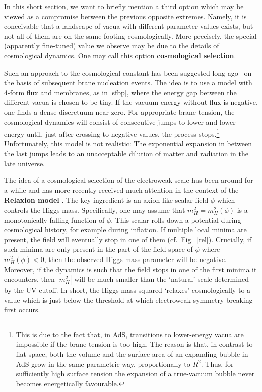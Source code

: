 \documentclass[12pt]{article}
\numberwithin{equation}{section}
\begin{document}
In this short section, we want to briefly mention a third option which may be viewed as a compromise between the previous opposite extremes. Namely, it is conceivable that a landscape of vacua with different parameter values exists, but not all of them are on the same footing cosmologically. More precisely, the special (apparently fine-tuned) value we observe may be due to the details of cosmological dynamics. One may call this option {\bf cosmological selection}.

Such an approach to the cosmological constant has been suggested long ago~\cite{Abbott:1984qf, Brown:1987dd, Feng:2000if} on the basis of subsequent brane nucleation events. The idea is to use a model with 4-form flux and membranes, as in \eqref{sfbp}, where the energy gap between the different vacua is chosen to be tiny. If the vacuum energy without flux is negative, one finds a dense discretuum near zero. For appropriate brane tension, the cosmological dynamics will consist of consecutive jumps to lower and lower energy until, just after crossing to negative values, the process stops.\footnote{
This 
is due to the fact that, in AdS, transitions to lower-energy vacua are impossible if the brane tension is too high. The reason is that, in contrast to flat space, both the volume and the surface area of an expanding bubble in AdS grow in the same parametric way, proportionally to $R^2$. Thus, for sufficiently high surface tension the expansion of a true-vacuum bubble never becomes energetically favourable.
}
Unfortunately, this model is not realistic: The exponential expansion in between the last jumps leads to an unacceptable dilution of matter and radiation in the late universe.

The idea of a cosmological selection of the electroweak scale has been around for a while \cite{Dvali:2003br, Dvali:2004tma} and has more recently received much attention in the context of the {\bf Relaxion model} \cite{Graham:2015cka}. The key ingredient is an axion-like scalar field $\phi$ which controls the Higgs mass. Specifically, one may assume that $m_H^2=m_H^2(\phi)$ is a monotonically falling function of $\phi$. This 
scalar rolls down a potential during cosmological history, for example during inflation. If multiple local minima are present, the field will eventually stop in one of them (cf.~Fig.~\ref{rel}). Crucially, if such minima are only present in the part of the field space of $\phi$ where $m^2_H(\phi)<0$, then the observed Higgs mass parameter will be negative. Moreover, if the dynamics is such that the field stops in one of the first minima it encounters, then $|m_H^2|$ will be much smaller than the `natural' scale determined by the UV cutoff. In short, the Higgs mass squared `relaxes' cosmologically to a value which is just below the threshold at which electroweak symmetry breaking first occurs.
\end{document}
